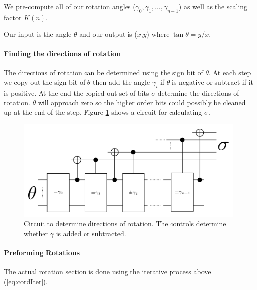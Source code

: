         We pre-compute all of our rotation angles ($\gamma_0,\gamma_1,\dotsc,\gamma_{n-1}$) as well as the scaling factor $K(n)$.

        Our input is the angle $\theta$ and our output is ($x$,$y$) where $\tan\theta = y/x$.

        \paragraph{Finding the directions of rotation}
            The directions of rotation can be determined using the sign bit of $\theta$.
            At each step we copy out the sign bit of $\theta$ then add the angle $\gamma_i$ if $\theta$ is negative or subtract if it is positive.
            At the end the copied out set of bits $\sigma$ determine the directions of rotation.
            $\theta$ will approach zero so the higher order bits could possibly be cleaned up at the end of the step.
            Figure \ref{fig:CORDICDirections} shows a circuit for calculating $\sigma$.
            \begin{figure}[p]
                \capstart
                \centering
                \includegraphics[width=\textwidth]{images/CORDICDirections}
                \caption{Circuit to determine directions of rotation.  The controls determine whether $\gamma$ is added or subtracted.}
                \label{fig:CORDICDirections}
            \end{figure}

        \paragraph{Preforming Rotations}
            The actual rotation section is done using the iterative process above (\cref{eq:cordIter}).

